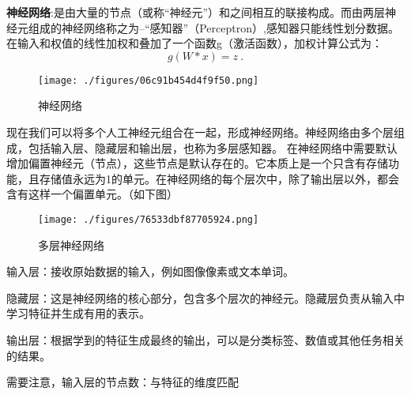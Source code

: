 \textbf{神经网络}:是由大量的节点（或称“神经元”）和之间相互的联接构成。而由两层神经元组成的神经网络称之为--“感知器”（Perceptron）,感知器只能线性划分数据。在输入和权值的线性加权和叠加了一个函数g（激活函数），加权计算公式为：
\begin{equation}
g(W * x) = z~.
\end{equation}
\begin{figure}[ht]
\centering
\texttt{[image: ./figures/06c91b454d4f9f50.png]}
\caption{神经网络} \label{fig_CNN1_4}
\end{figure}
现在我们可以将多个人工神经元组合在一起，形成神经网络。神经网络由多个层组成，包括输入层、隐藏层和输出层，也称为多层感知器。
在神经网络中需要默认增加偏置神经元（节点），这些节点是默认存在的。它本质上是一个只含有存储功能，且存储值永远为1的单元。在神经网络的每个层次中，除了输出层以外，都会含有这样一个偏置单元。（如下图）\begin{figure}[ht]
\centering
\texttt{[image: ./figures/76533dbf87705924.png]}
\caption{多层神经网络} \label{fig_CNN1_5}
\end{figure}
输入层：接收原始数据的输入，例如图像像素或文本单词。

隐藏层：这是神经网络的核心部分，包含多个层次的神经元。隐藏层负责从输入中学习特征并生成有用的表示。

输出层：根据学到的特征生成最终的输出，可以是分类标签、数值或其他任务相关的结果。

需要注意，输入层的节点数：与特征的维度匹配

